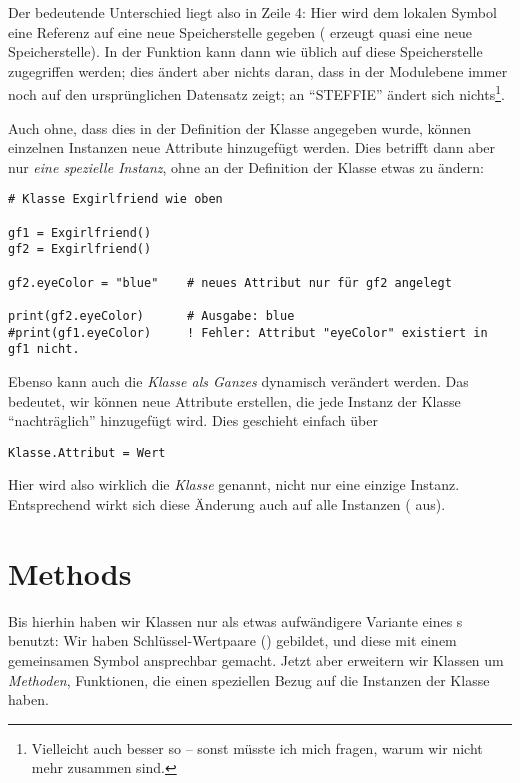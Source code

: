 Der bedeutende Unterschied liegt also in Zeile 4: Hier wird dem lokalen Symbol  eine Referenz auf eine neue Speicherstelle gegeben ( erzeugt quasi eine neue Speicherstelle). In der Funktion  kann dann wie üblich auf diese Speicherstelle zugegriffen werden; dies ändert aber nichts daran, dass  in der Modulebene immer noch auf den ursprünglichen Datensatz zeigt; an \enquote{STEFFIE} ändert sich nichts\footnote{Vielleicht auch besser so -- sonst müsste ich mich fragen, warum wir nicht mehr zusammen sind.}.

Auch ohne, dass dies in der Definition der Klasse angegeben wurde, können einzelnen Instanzen neue Attribute hinzugefügt werden. Dies betrifft dann aber nur \emph{eine spezielle Instanz}, ohne an der Definition der Klasse etwas zu ändern:
\begin{codebox}
\begin{verbatim}
# Klasse Exgirlfriend wie oben

gf1 = Exgirlfriend()
gf2 = Exgirlfriend()

gf2.eyeColor = "blue"    # neues Attribut nur für gf2 angelegt

print(gf2.eyeColor)      # Ausgabe: blue
#print(gf1.eyeColor)     ! Fehler: Attribut "eyeColor" existiert in gf1 nicht.
\end{verbatim}
\end{codebox}

Ebenso kann auch die \emph{Klasse als Ganzes} dynamisch verändert werden. Das bedeutet, wir können neue Attribute erstellen, die jede Instanz der Klasse \enquote{nachträglich} hinzugefügt wird. Dies geschieht einfach über
\begin{codebox}
\begin{verbatim}
Klasse.Attribut = Wert
\end{verbatim}
\end{codebox}

Hier wird also wirklich die \emph{Klasse} genannt, nicht nur eine einzige Instanz. Entsprechend wirkt sich diese Änderung auch auf alle Instanzen (\eg {} aus).

\section{Methods}
Bis hierhin haben wir Klassen nur als etwas aufwändigere Variante eines s benutzt: Wir haben Schlüssel-Wertpaare (\eg {}) gebildet, und diese mit einem gemeinsamen Symbol ansprechbar gemacht. Jetzt aber erweitern wir Klassen um \emph{Methoden}, \ie Funktionen, die einen speziellen Bezug auf die Instanzen der Klasse haben.

